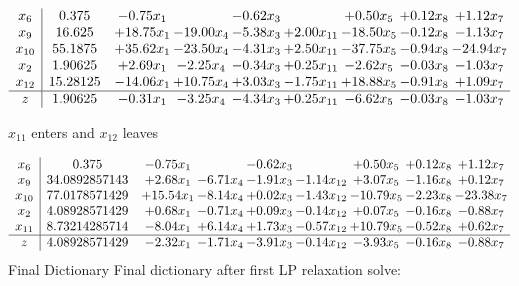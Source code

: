 \documentclass[8pt]{article}
\begin{document}
 \[\begin{array}{c| c c@{\hskip 2pt} c@{\hskip 2pt} c@{\hskip 2pt} c@{\hskip 2pt} c@{\hskip 2pt} c@{\hskip 2pt} c@{\hskip 2pt} }
 x_{6}   &  0.375 & -0.75 x_{1} &   & -0.62 x_{3} &   & +  0.50 x_{5} & +  0.12 x_{8} & +  1.12 x_{7}\\
 x_{9}   &  16.625 & + 18.75 x_{1} & -19.00 x_{4} & -5.38 x_{3} & +  2.00 x_{11} & -18.50 x_{5} & -0.12 x_{8} & -1.13 x_{7}\\
 x_{10}   &  55.1875 & + 35.62 x_{1} & -23.50 x_{4} & -4.31 x_{3} & +  2.50 x_{11} & -37.75 x_{5} & -0.94 x_{8} & -24.94 x_{7}\\
 x_{2}   &  1.90625 & +  2.69 x_{1} & -2.25 x_{4} & -0.34 x_{3} & +  0.25 x_{11} & -2.62 x_{5} & -0.03 x_{8} & -1.03 x_{7}\\
 x_{12}   &  15.28125 & -14.06 x_{1} & + 10.75 x_{4} & +  3.03 x_{3} & -1.75 x_{11} & + 18.88 x_{5} & -0.91 x_{8} & +  1.09 x_{7}\\
\hline
z    &  1.90625 & -0.31 x_{1} & -3.25 x_{4} & -4.34 x_{3} & +  0.25 x_{11} & -6.62 x_{5} & -0.03 x_{8} & -1.03 x_{7}\\
\end{array}\]


 $ x_{11} $ enters and $ x_{12} $ leaves 

 \[\begin{array}{c| c c@{\hskip 2pt} c@{\hskip 2pt} c@{\hskip 2pt} c@{\hskip 2pt} c@{\hskip 2pt} c@{\hskip 2pt} c@{\hskip 2pt} }
 x_{6}   &  0.375 & -0.75 x_{1} &   & -0.62 x_{3} &   & +  0.50 x_{5} & +  0.12 x_{8} & +  1.12 x_{7}\\
 x_{9}   &  34.0892857143 & +  2.68 x_{1} & -6.71 x_{4} & -1.91 x_{3} & -1.14 x_{12} & +  3.07 x_{5} & -1.16 x_{8} & +  0.12 x_{7}\\
 x_{10}   &  77.0178571429 & + 15.54 x_{1} & -8.14 x_{4} & +  0.02 x_{3} & -1.43 x_{12} & -10.79 x_{5} & -2.23 x_{8} & -23.38 x_{7}\\
 x_{2}   &  4.08928571429 & +  0.68 x_{1} & -0.71 x_{4} & +  0.09 x_{3} & -0.14 x_{12} & +  0.07 x_{5} & -0.16 x_{8} & -0.88 x_{7}\\
 x_{11}   &  8.73214285714 & -8.04 x_{1} & +  6.14 x_{4} & +  1.73 x_{3} & -0.57 x_{12} & + 10.79 x_{5} & -0.52 x_{8} & +  0.62 x_{7}\\
\hline
z    &  4.08928571429 & -2.32 x_{1} & -1.71 x_{4} & -3.91 x_{3} & -0.14 x_{12} & -3.93 x_{5} & -0.16 x_{8} & -0.88 x_{7}\\
\end{array}\]
Final Dictionary
Final dictionary after first LP relaxation solve: 
\end{document}
